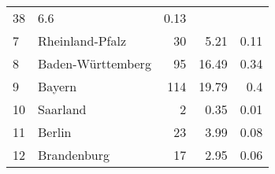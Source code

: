 \begin{longtable}{lXrrr}
       \num{38} &
       \num[round-mode=places,round-precision=2]{6.6} &
         \num[round-mode=places,round-precision=2]{0.13} \\

     7 &
     \multicolumn{1}{X}{ Rheinland-Pfalz   } &


       \num{30} &
       \num[round-mode=places,round-precision=2]{5.21} &
         \num[round-mode=places,round-precision=2]{0.11} \\

     8 &
     \multicolumn{1}{X}{ Baden-Württemberg   } &


       \num{95} &
       \num[round-mode=places,round-precision=2]{16.49} &
         \num[round-mode=places,round-precision=2]{0.34} \\

     9 &
     \multicolumn{1}{X}{ Bayern   } &


       \num{114} &
       \num[round-mode=places,round-precision=2]{19.79} &
         \num[round-mode=places,round-precision=2]{0.4} \\

     10 &
     \multicolumn{1}{X}{ Saarland   } &


       \num{2} &
       \num[round-mode=places,round-precision=2]{0.35} &
         \num[round-mode=places,round-precision=2]{0.01} \\

     11 &
     \multicolumn{1}{X}{ Berlin   } &


       \num{23} &
       \num[round-mode=places,round-precision=2]{3.99} &
         \num[round-mode=places,round-precision=2]{0.08} \\

     12 &
     \multicolumn{1}{X}{ Brandenburg   } &


       \num{17} &
       \num[round-mode=places,round-precision=2]{2.95} &
         \num[round-mode=places,round-precision=2]{0.06} \\


\end{longtable}
